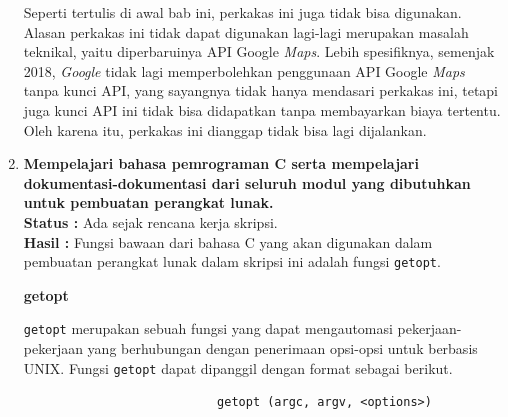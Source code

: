 \documentclass[a4paper,twoside]{article}
\begin{document}
\begin{enumerate}
Seperti tertulis di awal bab ini, perkakas ini juga tidak bisa digunakan. Alasan perkakas ini tidak dapat digunakan lagi-lagi merupakan masalah teknikal, yaitu diperbaruinya API Google \textit{Maps}. Lebih spesifiknya, semenjak 2018, \textit{Google} tidak lagi memperbolehkan penggunaan API Google \textit{Maps} tanpa kunci API, yang sayangnya tidak hanya mendasari perkakas ini, tetapi juga kunci API ini tidak bisa didapatkan tanpa membayarkan biaya tertentu. Oleh karena itu, perkakas ini dianggap tidak bisa lagi dijalankan.
		
		\item \textbf{Mempelajari bahasa pemrograman C serta mempelajari dokumentasi-dokumentasi dari seluruh modul yang dibutuhkan untuk pembuatan perangkat lunak.}\\
		{\bf Status :} Ada sejak rencana kerja skripsi.\\
		{\bf Hasil :} Fungsi bawaan dari bahasa C yang akan digunakan dalam pembuatan perangkat lunak dalam skripsi ini adalah fungsi \verb|getopt|.

\vspace{\baselineskip}
\textbf{\large{getopt} \cite{loosemore:2022:gnuclibrary}}
\label{sec:cmodules-getopt}

\verb|getopt| merupakan sebuah fungsi yang dapat mengautomasi pekerjaan-pekerjaan yang berhubungan dengan penerimaan opsi-opsi untuk \cl berbasis UNIX.
\newline\newline\noindent
Fungsi \verb|getopt| dapat dipanggil dengan format sebagai berikut.

\begin{verbatim}
                           getopt (argc, argv, <options>)
\end{verbatim}


\end{enumerate}
\end{document}
